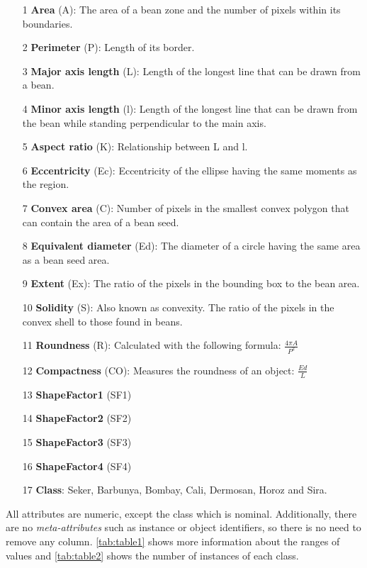 \documentclass[a4paper,11pt]{article}
\begin{document}
\begin{itemize}
\setlength\itemsep{-1ex}
\item[1] \textbf{Area} (A): The area of a bean zone and the number of pixels within its boundaries.
\item[2] \textbf{Perimeter} (P): Length of its border.
\item[3] \textbf{Major axis length} (L): Length of the longest line that can be drawn from a bean.
\item[4] \textbf{Minor axis length} (l): Length of the longest line that can be drawn from the bean while standing perpendicular to the main axis.
\item[5] \textbf{Aspect ratio} (K): Relationship between L and l.
\item[6] \textbf{Eccentricity} (Ec): Eccentricity of the ellipse having the same moments as the region.
\item[7] \textbf{Convex area} (C): Number of pixels in the smallest convex polygon that can contain the area of a bean seed.
\item[8] \textbf{Equivalent diameter} (Ed): The diameter of a circle having the same area as a bean seed area.
\item[9] \textbf{Extent} (Ex): The ratio of the pixels in the bounding box to the bean area.
\item[10] \textbf{Solidity} (S): Also known as convexity. The ratio of the pixels in the convex shell to those found in beans.
\item[11] \textbf{Roundness} (R): Calculated with the following formula: $\frac{4\pi A}{P^2}$
\item[12] \textbf{Compactness} (CO): Measures the roundness of an object: $\frac{Ed}{L}$
\item[13] \textbf{ShapeFactor1} (SF1)
\item[14] \textbf{ShapeFactor2} (SF2)
\item[15] \textbf{ShapeFactor3} (SF3)
\item[16] \textbf{ShapeFactor4} (SF4)
\item[17] \textbf{Class}: Seker, Barbunya, Bombay, Cali, Dermosan, Horoz and Sira.
\end{itemize}

All attributes are numeric, except the class which is nominal. Additionally, there are no \textit{meta-attributes} such as instance or object identifiers, so there is no need to remove any column. \autoref{tab:table1} shows more information about the ranges of values and \autoref{tab:table2} shows the number of instances of each class.
\end{document}
